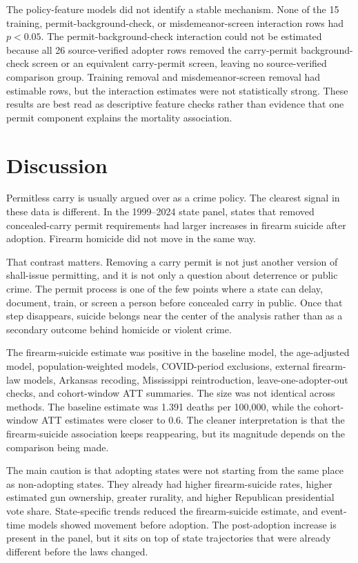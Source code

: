 \documentclass[11pt]{article}
\begin{document}
The policy-feature models did not identify a stable mechanism. None of the 15 training, permit-background-check, or misdemeanor-screen interaction rows had $p<0.05$. The permit-background-check interaction could not be estimated because all 26 source-verified adopter rows removed the carry-permit background-check screen or an equivalent carry-permit screen, leaving no source-verified comparison group. Training removal and misdemeanor-screen removal had estimable rows, but the interaction estimates were not statistically strong. These results are best read as descriptive feature checks rather than evidence that one permit component explains the mortality association.

\section*{Discussion}

Permitless carry is usually argued over as a crime policy. The clearest signal in these data is different. In the 1999--2024 state panel, states that removed concealed-carry permit requirements had larger increases in firearm suicide after adoption. Firearm homicide did not move in the same way.

That contrast matters. Removing a carry permit is not just another version of shall-issue permitting, and it is not only a question about deterrence or public crime. The permit process is one of the few points where a state can delay, document, train, or screen a person before concealed carry in public. Once that step disappears, suicide belongs near the center of the analysis rather than as a secondary outcome behind homicide or violent crime.

The firearm-suicide estimate was positive in the baseline model, the age-adjusted model, population-weighted models, COVID-period exclusions, external firearm-law models, Arkansas recoding, Mississippi reintroduction, leave-one-adopter-out checks, and cohort-window ATT summaries. The size was not identical across methods. The baseline estimate was 1.391 deaths per 100,000, while the cohort-window ATT estimates were closer to 0.6. The cleaner interpretation is that the firearm-suicide association keeps reappearing, but its magnitude depends on the comparison being made.

The main caution is that adopting states were not starting from the same place as non-adopting states. They already had higher firearm-suicide rates, higher estimated gun ownership, greater rurality, and higher Republican presidential vote share. State-specific trends reduced the firearm-suicide estimate, and event-time models showed movement before adoption. The post-adoption increase is present in the panel, but it sits on top of state trajectories that were already different before the laws changed.
\end{document}
